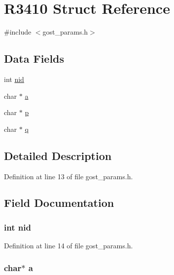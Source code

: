 \hypertarget{struct_r3410}{}\section{R3410 Struct Reference}
\label{struct_r3410}


{\ttfamily \#include $<$gost\+\_\+params.\+h$>$}

\subsection*{Data Fields}
\begin{DoxyCompactItemize}
\item 
int \hyperlink{struct_r3410_a7235ef62e89328f5155846dc59c6fc37}{nid}
\item 
char $\ast$ \hyperlink{struct_r3410_ae46bdd7e2214e709576b46f5282340b8}{a}
\item 
char $\ast$ \hyperlink{struct_r3410_aaa1ebe818ec1c763a776cc580551f3e6}{p}
\item 
char $\ast$ \hyperlink{struct_r3410_a5d2b44119a969086f33b7b0e909c3cdc}{q}
\end{DoxyCompactItemize}


\subsection{Detailed Description}


Definition at line 13 of file gost\+\_\+params.\+h.



\subsection{Field Documentation}
\subsubsection[{\texorpdfstring{nid}{nid}}]{\setlength{\rightskip}{0pt plus 5cm}int nid}\hypertarget{struct_r3410_a7235ef62e89328f5155846dc59c6fc37}{}\label{struct_r3410_a7235ef62e89328f5155846dc59c6fc37}


Definition at line 14 of file gost\+\_\+params.\+h.

\subsubsection[{\texorpdfstring{a}{a}}]{\setlength{\rightskip}{0pt plus 5cm}char$\ast$ a}\hypertarget{struct_r3410_ae46bdd7e2214e709576b46f5282340b8}{}\label{struct_r3410_ae46bdd7e2214e709576b46f5282340b8}


